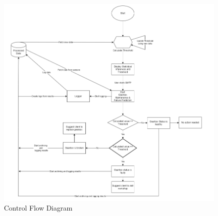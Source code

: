 \label{sec:control-flow}
\begin{figure}
	\centering
	\includegraphics[width=1.2\linewidth]{images/control-flow-diagram.png}
	\caption{Control Flow Diagram}
\end{figure} 